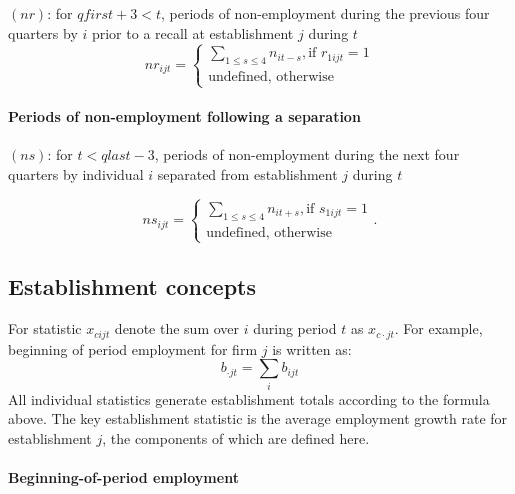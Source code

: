 
$\left( nr\right) $: for $qfirst+3<t$, periods of non-employment during the
previous four quarters by $i$ prior to a recall at establishment $j$ during $%
t$%
\begin{equation}
nr_{ijt}=\left\{ 
\begin{array}{l}
{\sum\limits_{1\leqslant s\leqslant 4}{n_{it-s}},}\text{if }{r_{1ijt}=1} \\ 
\text{{undefined, otherwise}}%
\end{array}%
\right.
\end{equation}

\paragraph{Periods of non-employment following a separation}


$\left( ns\right) $: for $t<qlast-3$, periods of non-employment during the
next four quarters by individual $i$ separated from establishment $j$ during 
$t$

\begin{equation}
ns_{ijt}=\left\{ 
\begin{array}{l}
{\sum\limits_{1\leqslant s\leqslant 4}{n_{it+s}},}\text{if }{s_{1ijt}=1} \\ 
\text{{undefined, otherwise}}%
\end{array}%
\right. .
\end{equation}

\subsection{Establishment concepts}

\label{sec:technical:employer}

For statistic $x_{cijt}$ denote the sum over $i$ during period $t$ as $%
x_{c\cdot jt}$. For example, beginning of period employment for firm $j$ is
written as:%
\begin{equation}
b_{\cdot jt}=\sum\limits_{i}b_{ijt}
\end{equation}%
All individual statistics generate establishment totals according to the
formula above. The key establishment statistic is the average employment
growth rate for establishment $j$, the components of which are defined here.

\paragraph{Beginning-of-period employment}

